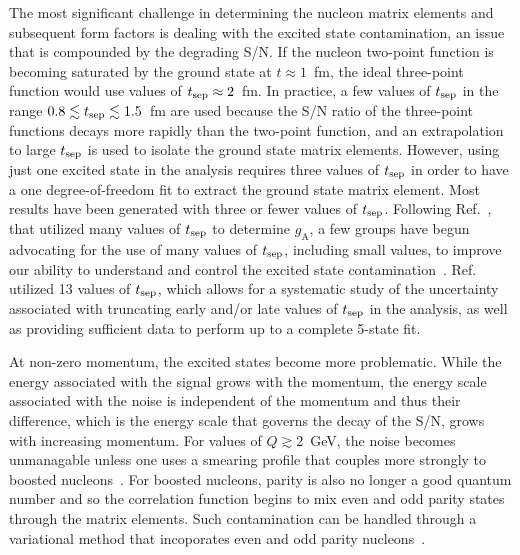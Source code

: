 \documentclass{ar-1col}
\def\tsep{t_{\rm sep}}
\begin{document}
The most significant challenge in determining the nucleon matrix elements and subsequent form factors is dealing with the excited state contamination, an issue that is compounded by the degrading S/N.
If the nucleon two-point function is becoming saturated by the ground state at $t\approx1$~fm, the ideal three-point function would use values of $\tsep\approx2$~fm.
In practice, a few values of $\tsep$ in the range $0.8 \lesssim \tsep \lesssim 1.5$~fm are used because the S/N ratio of the three-point functions decays more rapidly than the two-point function, and an extrapolation to large $\tsep$ is used to isolate the ground state matrix elements.
However, using just one excited state in the analysis requires three values of $\tsep$ in order to have a one degree-of-freedom fit to extract the ground state matrix element.
Most results have been generated with three or fewer values of $\tsep$.
Following Ref.~\cite{Chang:2018uxx}, that utilized many values of $\tsep$ to determine $g_{\mathrm{A}}$, a few groups have begun advocating for the use of many values of $\tsep$, including small values, to improve our ability to understand and control the excited state contamination~\cite{Hasan:2019noy,Alexandrou:2019brg,He:2021yvm}.
Ref.~\cite{He:2021yvm} utilized 13 values of $\tsep$, which allows for a systematic study of the uncertainty associated with truncating early and/or late values of $\tsep$ in the analysis, as well as providing sufficient data to perform up to a complete 5-state fit.

At non-zero momentum, the excited states become more problematic.  While the energy associated with the signal grows with the momentum, the energy scale associated with the noise is independent of the momentum and thus their difference, which is the energy scale that governs the decay of the S/N, grows with increasing momentum.
For values of $Q\gtrsim 2$~GeV, the noise becomes unmanagable unless one uses a smearing profile that couples more strongly to boosted nucleons~\cite{Bali:2016lva}.
For boosted nucleons, parity is also no longer a good quantum number and so the correlation function begins to mix even and odd parity states through the matrix elements.  Such contamination can be handled through a variational method that incoporates even and odd parity nucleons~\cite{Stokes:2013fgw,Stokes:2018emx,Stokes:2019zdd}.
\end{document}
